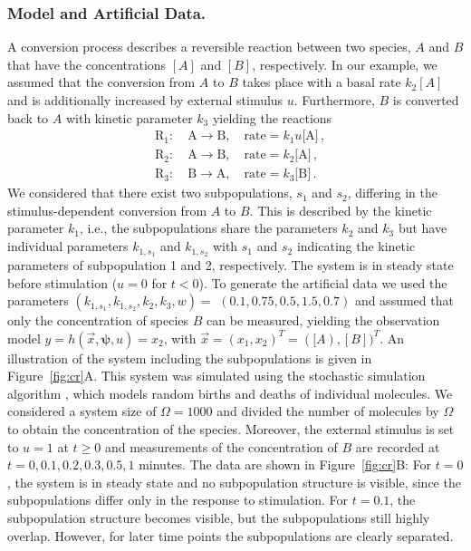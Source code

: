 \documentclass{llncs}
\newcommand{\x}{\vec{x}}
\newcommand{\vpsi}{\boldsymbol{\psi}}
\begin{document}
\subsubsection{Model and Artificial Data.}
A conversion process describes a reversible reaction between two species, $A$ and $B$ that have the concentrations $[A]$ and $[B]$, respectively. In our example, we assumed that the conversion from $A$ to $B$ takes place with a basal rate $k_2[A]$ and is additionally increased by external stimulus $u$. Furthermore, $B$ is converted back to $A$ with kinetic parameter $k_3$ yielding the reactions
\begin{align*}
&\mbox{R}_{1}:\quad  \text{A} \to \text{B} , \quad \mbox{rate} = k_{1}u \big[ \text{A}  \big]\,, \\
&\mbox{R}_{2}:\quad  \text{A} \to \text{B} , \quad \mbox{rate} = k_{2} \big[ \text{A}  \big]\,,\\
&\mbox{R}_{3}: \quad \text{B} \to \text{A},  \quad \mbox{rate} = k_{3} \big[ \text{B}   \big]\,.
\end{align*}
We considered that there exist two subpopulations, $s_{1}$ and $s_{2}$, differing in the stimulus-dependent conversion from $A$ to $B$. This is described by the kinetic parameter $k_1$, i.e., the subpopulations share the parameters $k_2$ and $k_3$ but have individual parameters $k_{1,s_1}$ and $k_{1,s_2}$ with $s_1$ and $s_2$ indicating the kinetic parameters of subpopulation 1 and 2, respectively. The system is in steady state before stimulation ($u=0$ for $t<0$). To generate the artificial data we used the parameters $(k_{1,s_1},k_{1,s_2},k_2,k_3,w)= $ $(0.1,0.75,0.5,1.5,0.7)$ and assumed that only the concentration of species $B$ can be measured, yielding the observation model $y = h(\x,\vpsi,u) = x_2$, with $\x = (x_1,x_2)^T = ([A),[B])^T$. An illustration of the system including the subpopulations is given in Figure~\ref{fig:cr}A. This system was simulated using the stochastic simulation algorithm \cite{Gillespie2007}, which models random births and deaths of individual molecules. We considered a system size of $\Omega =1000$ and divided the number of molecules by $\Omega$ to obtain the concentration of the species. Moreover, the external stimulus is set to $u=1$ at $t\geq0$ and measurements of the concentration of $B$ are recorded at $t=0, 0.1, 0.2, 0.3, 0.5, 1$ minutes. The data are shown in Figure~\ref{fig:cr}B:  For $t=0$, the system is in steady state and no subpopulation structure is visible, since the subpopulations differ only in the response to stimulation. For $t=0.1$, the subpopulation structure becomes visible, but the subpopulations still highly overlap. However, for later time points the subpopulations are clearly separated. 
\end{document}
